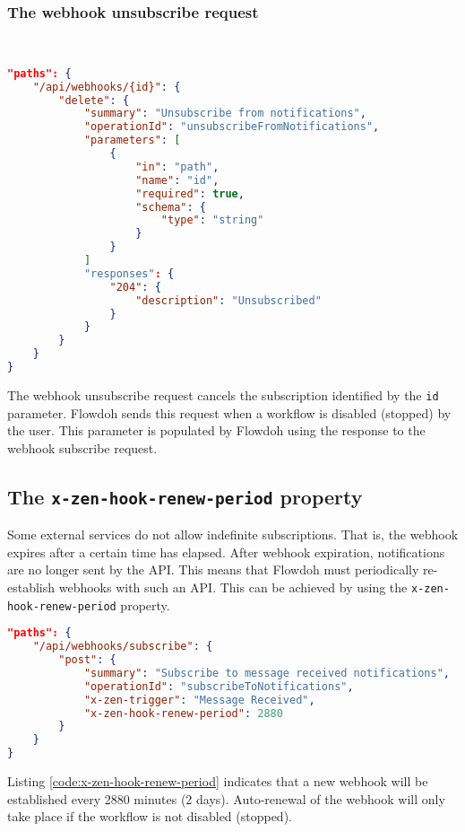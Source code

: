 \subsubsection{The webhook unsubscribe request}
\hfill\\
\begin{minipage}{\textwidth}
\begin{lstlisting}[caption={Webhook unsubscribe request},label={code:webhookunsubscribe},language=json]
"paths": {
    "/api/webhooks/{id}": {
        "delete": {
            "summary": "Unsubscribe from notifications",
            "operationId": "unsubscribeFromNotifications",
            "parameters": [
                {
                    "in": "path",
                    "name": "id",
                    "required": true,
                    "schema": {
                        "type": "string"
                    }
                }
            ]
            "responses": {
                "204": {
                    "description": "Unsubscribed"
                }
            }
        }
    }
}
\end{lstlisting}
\end{minipage}
The webhook unsubscribe request cancels the subscription identified by the \texttt{id} parameter. Flowdoh sends this request when a workflow is disabled (stopped) by the user. This parameter is populated by Flowdoh using the response to the webhook subscribe request.
\subsection{The \texttt{x-zen-hook-renew-period} property}
Some external services do not allow indefinite subscriptions. That is, the webhook expires after a certain time has elapsed. After webhook expiration, notifications are no longer sent by the API. This means that Flowdoh must periodically re-establish webhooks with such an API. This can be achieved by using the \texttt{x-zen-hook-renew-period} property.\\
\begin{minipage}{\textwidth}
\begin{lstlisting}[caption={\texttt{x-zen-hook-renew-period} usage},label={code:x-zen-hook-renew-period},language=json]
"paths": {
    "/api/webhooks/subscribe": {
        "post": {
            "summary": "Subscribe to message received notifications",
            "operationId": "subscribeToNotifications",
            "x-zen-trigger": "Message Received",
            "x-zen-hook-renew-period": 2880
        }
    }
}
\end{lstlisting}
\end{minipage}
Listing \ref{code:x-zen-hook-renew-period} indicates that a new webhook will be established every 2880 minutes (2 days). Auto-renewal of the webhook will only take place if the workflow is not disabled (stopped).
